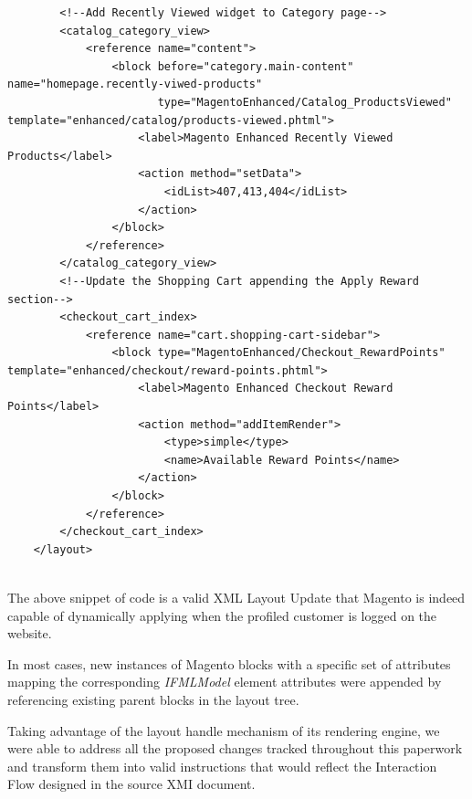 \begin{lstlisting}
        <!--Add Recently Viewed widget to Category page-->
        <catalog_category_view>
            <reference name="content">
                <block before="category.main-content" name="homepage.recently-viwed-products"
                       type="MagentoEnhanced/Catalog_ProductsViewed" template="enhanced/catalog/products-viewed.phtml">
                    <label>Magento Enhanced Recently Viewed Products</label>
                    <action method="setData">
                        <idList>407,413,404</idList>
                    </action>
                </block>
            </reference>
        </catalog_category_view>
        <!--Update the Shopping Cart appending the Apply Reward section-->
        <checkout_cart_index>
            <reference name="cart.shopping-cart-sidebar">
                <block type="MagentoEnhanced/Checkout_RewardPoints" template="enhanced/checkout/reward-points.phtml">
                    <label>Magento Enhanced Checkout Reward Points</label>
                    <action method="addItemRender">
                        <type>simple</type>
                        <name>Available Reward Points</name>
                    </action>
                </block>
            </reference>
        </checkout_cart_index>
    </layout>
    
\end{lstlisting}
\vspace{0.5cm}

The above snippet of code is a valid XML Layout Update that Magento is indeed capable of dynamically applying when the profiled customer is logged on the website.

In most cases, new instances of Magento blocks with a specific set of attributes mapping the corresponding \textit{IFMLModel} element attributes were appended by referencing existing parent blocks in the layout tree. 

Taking advantage of the layout handle mechanism of its rendering engine, we were able to address all the proposed changes tracked throughout this paperwork and transform them into valid instructions that would reflect the Interaction Flow designed in the source XMI document. 

